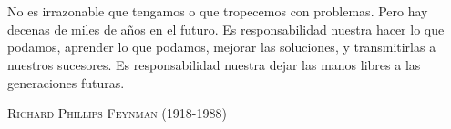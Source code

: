 \chapter*{}

\begin{flushright}
  \begin{minipage}[t]{0.6\textwidth} 
    No es irrazonable que tengamos o que tropecemos con problemas. Pero hay decenas de miles de años en el futuro. Es responsabilidad nuestra hacer lo que podamos, aprender lo que podamos, mejorar las soluciones, y transmitirlas a nuestros sucesores. Es responsabilidad nuestra dejar las manos libres a las generaciones futuras.
    \begin{flushright} 
      \textsc{Richard Phillips Feynman (1918-1988)}
    \end{flushright}
  \end{minipage}
\end{flushright}

